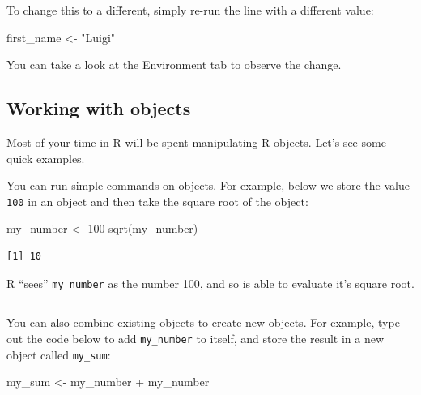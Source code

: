 \documentclass[
  letterpaper,
  DIV=11,
  numbers=noendperiod]{scrreprt}
\newenvironment{Shaded}{\begin{snugshade}}{\end{snugshade}}
\newcommand{\DecValTok}[1]{\textcolor[rgb]{0.68,0.00,0.00}{#1}}
\newcommand{\FunctionTok}[1]{\textcolor[rgb]{0.28,0.35,0.67}{#1}}
\newcommand{\NormalTok}[1]{\textcolor[rgb]{0.00,0.23,0.31}{#1}}
\newcommand{\OtherTok}[1]{\textcolor[rgb]{0.00,0.23,0.31}{#1}}
\newcommand{\SpecialCharTok}[1]{\textcolor[rgb]{0.37,0.37,0.37}{#1}}
\newcommand{\StringTok}[1]{\textcolor[rgb]{0.13,0.47,0.30}{#1}}
\begin{document}
To change this to a different, simply re-run the line with a different
value:

\begin{Shaded}
\begin{Highlighting}[]
\NormalTok{first\_name }\OtherTok{\textless{}{-}} \StringTok{"Luigi"}
\end{Highlighting}
\end{Shaded}

You can take a look at the Environment tab to observe the change.

\subsection{Working with objects}\label{working-with-objects}

Most of your time in R will be spent manipulating R objects. Let's see
some quick examples.

You can run simple commands on objects. For example, below we store the
value \texttt{100} in an object and then take the square root of the
object:

\begin{Shaded}
\begin{Highlighting}[]
\NormalTok{my\_number }\OtherTok{\textless{}{-}} \DecValTok{100}
\FunctionTok{sqrt}\NormalTok{(my\_number)}
\end{Highlighting}
\end{Shaded}

\begin{verbatim}
[1] 10
\end{verbatim}

R ``sees'' \texttt{my\_number} as the number 100, and so is able to
evaluate it's square root.

\begin{center}\rule{0.5\linewidth}{0.5pt}\end{center}

You can also combine existing objects to create new objects. For
example, type out the code below to add \texttt{my\_number} to itself,
and store the result in a new object called \texttt{my\_sum}:

\begin{Shaded}
\begin{Highlighting}[]
\NormalTok{my\_sum }\OtherTok{\textless{}{-}}\NormalTok{ my\_number }\SpecialCharTok{+}\NormalTok{ my\_number}
\end{Highlighting}
\end{Shaded}
\end{document}
